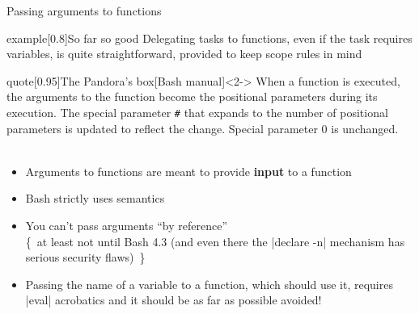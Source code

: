 \begin{frame}{Passing arguments to functions}
    \vspace{-3mm}
    \begin{varblock}{example}[0.8\textwidth]{So far so good}
        Delegating tasks to functions, even if the task requires variables, is quite straightforward, provided to keep scope rules in mind
    \end{varblock}
    \begin{varblock}{quote}[0.95\textwidth]{The Pandora's box}[Bash manual]<2->
        When a function is executed, the arguments to the function become the positional parameters during its execution.
        The special parameter \texttt{\#} that expands to the number of positional parameters is updated to reflect the change.
        Special parameter 0 is unchanged.\\[-1.5ex] ~
    \end{varblock}
    \vspace{-2mm}
    \begin{itemize}[<3->]
        \item Arguments to functions are meant to provide \textbf{input} to a function
        \item Bash strictly uses  semantics
        \item You can't pass arguments ``by reference''\\[-0.5ex] {\tiny\{~at least not until Bash 4.3 (and even there the \bash|declare -n| mechanism has serious security flaws)~\}}
        \item \alert{Passing the name of a variable to a function}, which should use it, requires \bash|eval| acrobatics and it \alert{should be as far as possible avoided!}
    \end{itemize}
\end{frame}
